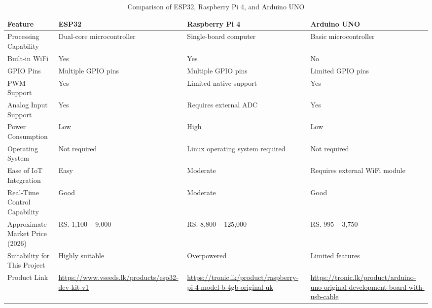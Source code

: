 \documentclass[12pt,a4paper]{report}
\begin{document}
\begin{table}[H]
\centering
\small
\begin{tabularx}{\textwidth}{|p{3cm}|>{\raggedright\arraybackslash}X|>{\raggedright\arraybackslash}X|>{\raggedright\arraybackslash}X|}
\hline
\textbf{Feature} & \textbf{ESP32} & \textbf{Raspberry Pi 4} & \textbf{Arduino UNO} \\
\hline

Processing Capability &
Dual-core microcontroller &
Single-board computer &
Basic microcontroller \\
\hline

Built-in WiFi &
Yes &
Yes &
No \\
\hline

GPIO Pins &
Multiple GPIO pins &
Multiple GPIO pins &
Limited GPIO pins \\
\hline

PWM Support &
Yes &
Limited native support &
Yes \\
\hline

Analog Input Support &
Yes &
Requires external ADC &
Yes \\
\hline

Power Consumption &
Low &
High &
Low \\
\hline

Operating System &
Not required &
Linux operating system required &
Not required \\
\hline

Ease of IoT Integration &
Easy &
Moderate &
Requires external WiFi module \\
\hline

Real-Time Control Capability &
Good &
Moderate &
Good \\
\hline

Approximate Market Price (2026) &
RS. 1,100 -- 9,000 &
RS. 8,800 -- 125,000 &
RS. 995 -- 3,750 \\
\hline

Suitability for This Project &
Highly suitable &
Overpowered &
Limited features \\
\hline

Product Link &
\url{https://www.vseeds.lk/products/esp32-dev-kit-v1} &
\url{https://tronic.lk/product/raspberry-pi-4-model-b-4gb-original-uk} &
\url{https://tronic.lk/product/arduino-uno-original-development-board-with-usb-cable} \\
\hline

\end{tabularx}
\caption{Comparison of ESP32, Raspberry Pi 4, and Arduino UNO}
\end{table}
\end{document}
